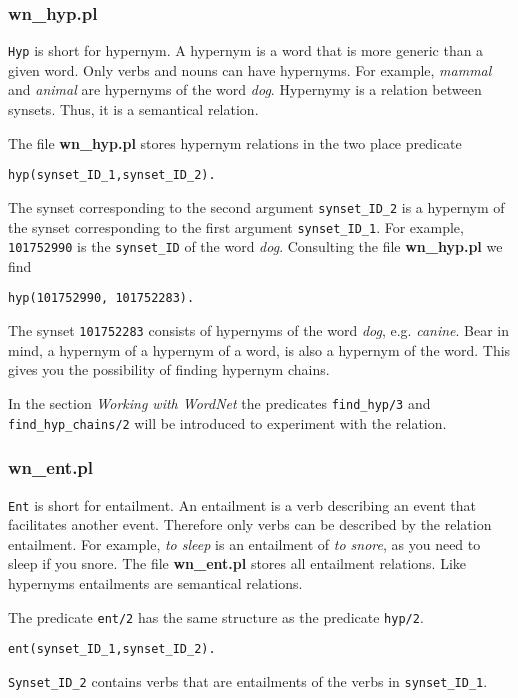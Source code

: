 \documentclass[12pt]{article}
\begin{document}
\subsubsection{wn\_hyp.pl}

{\tt Hyp} is short for hypernym. A hypernym is a word that is more generic than a given word. Only verbs and nouns can have
hypernyms. For example, \emph{mammal} and \emph{animal}
are hypernyms of the word \emph{dog}. Hypernymy is a relation between synsets. Thus, it is a semantical relation.

The file {\bfseries wn\_hyp.pl} stores hypernym relations in the two place predicate
\begin{verbatim}
hyp(synset_ID_1,synset_ID_2).
\end{verbatim}
The synset corresponding to the second argument {\tt synset\_ID\_2} is a hypernym of the synset corresponding to the first argument
{\tt synset\_ID\_1}. For example, {\tt 101752990} is the {\tt synset\_ID} of the word \emph{dog}.
Consulting the file {\bfseries wn\_hyp.pl} we find
\begin{verbatim}
hyp(101752990, 101752283).
\end{verbatim}
The synset {\tt 101752283} consists of hypernyms of the word \emph{dog}, e.g. \emph{canine}.
Bear in mind, a hypernym of a hypernym of a word, is also a hypernym of the word. This gives you the
possibility of finding hypernym chains.

In the section \emph{Working with WordNet} the predicates {\tt find\_hyp/3} and {\tt find\_hyp\_chains/2} will be introduced to
experiment with the relation.

\subsubsection{wn\_ent.pl}


{\tt Ent} is short for entailment. An entailment is a verb describing an event that facilitates another event.
Therefore only verbs can be described by
the relation entailment. For example, \emph{to sleep} is an entailment of \emph{to snore}, as you need to sleep if you snore.
The file {\bfseries wn\_ent.pl} stores all entailment relations. Like hypernyms entailments are semantical relations.

The predicate {\tt ent/2} has the same structure as the predicate {\tt hyp/2}.
\begin{verbatim}
ent(synset_ID_1,synset_ID_2).
\end{verbatim}
{\tt Synset\_ID\_2} contains verbs that are entailments of the verbs in {\tt synset\_ID\_1}.
\end{document}
